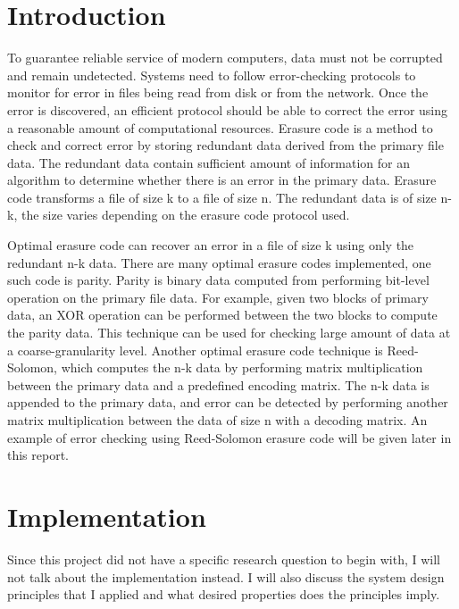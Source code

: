 
\section{Introduction}

To guarantee reliable service of modern computers, data must not be corrupted and remain undetected. Systems need to follow error-checking protocols to monitor for error in files being read from disk or from the network. Once the error is discovered, an efficient protocol should be able to correct the error using a reasonable amount of computational resources. Erasure code is a method to check and correct error by storing redundant data derived from the primary file data. The redundant data contain sufficient amount of information for an algorithm to determine whether there is an error in the primary data. Erasure code transforms a file of size k to a file of size n. The redundant data is of size n-k, the size varies depending on the erasure code protocol used.

Optimal erasure code can recover an error in a file of size k using only the redundant n-k data. There are many optimal erasure codes implemented, one such code is parity. Parity is binary data computed from performing bit-level operation on the primary file data. For example, given two blocks of primary data, an XOR operation can be performed between the two blocks to compute the parity data. This technique can be used for checking large amount of data at a coarse-granularity level. Another optimal erasure code technique is Reed-Solomon, which computes the n-k data by performing matrix multiplication between the primary data and a predefined encoding matrix. The n-k data is appended to the primary data, and error can be detected by performing another matrix multiplication between the data of size n with a decoding matrix. An example of error checking using Reed-Solomon erasure code will be given later in this report.


\section{Implementation}

Since this project did not have a specific research question to begin with, I will not talk about the implementation instead. I will also discuss the system design principles that I applied and what desired properties does the principles imply. 

